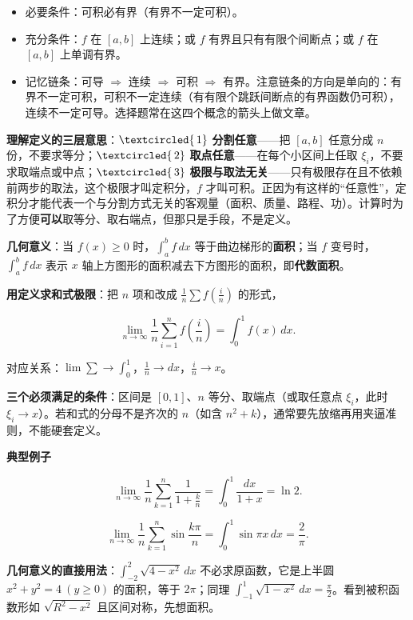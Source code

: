 \documentclass[11pt,openany,UTF8]{ctexbook}
\newcommand{\circled}[1]{\textcircled{\scriptsize\,#1}}
\begin{document}
\begin{itemize}
\item 必要条件：可积必有界（有界不一定可积）。
\item 充分条件：$f$ 在 $[a,b]$ 上连续；或 $f$ 有界且只有有限个间断点；或 $f$ 在 $[a,b]$ 上单调有界。
\item 记忆链条：可导 $\Rightarrow$ 连续 $\Rightarrow$ 可积 $\Rightarrow$ 有界。注意链条的方向是单向的：有界不一定可积，可积不一定连续（有有限个跳跃间断点的有界函数仍可积），连续不一定可导。选择题常在这四个概念的箭头上做文章。
\end{itemize}
\textbf{理解定义的三层意思}：$\circled{1}$ \textbf{分割任意}——把 $[a,b]$ 任意分成 $n$ 份，不要求等分；$\circled{2}$ \textbf{取点任意}——在每个小区间上任取 $\xi_i$，不要求取端点或中点；$\circled{3}$ \textbf{极限与取法无关}——只有极限存在且不依赖前两步的取法，这个极限才叫定积分，$f$ 才叫可积。正因为有这样的“任意性”，定积分才能代表一个与分割方式无关的客观量（面积、质量、路程、功）。计算时为了方便\textbf{可以}取等分、取右端点，但那只是手段，不是定义。

\textbf{几何意义}：当 $f(x)\geq0$ 时，$\int_a^bf\,dx$ 等于曲边梯形的\textbf{面积}；当 $f$ 变号时，$\int_a^bf\,dx$ 表示 $x$ 轴上方图形的面积减去下方图形的面积，即\textbf{代数面积}。

\textbf{用定义求和式极限}：把 $n$ 项和改成 $\frac{1}{n}\sum f\left(\frac{i}{n}\right)$ 的形式，

\[\lim_{n\to\infty}\frac{1}{n}\sum_{i=1}^{n}f\left(\frac{i}{n}\right)=\int_0^1f(x)\,dx.\]

对应关系：$\lim\sum\to\int_0^1$，$\frac{1}{n}\to dx$，$\frac{i}{n}\to x$。

\textbf{三个必须满足的条件}：区间是 $[0,1]$、$n$ 等分、取端点（或取任意点 $\xi_i$，此时 $\xi_i\to x$）。若和式的分母不是齐次的 $n$（如含 $n^2+k$），通常要先放缩再用夹逼准则，不能硬套定义。

\textbf{典型例子}

\[\lim_{n\to\infty}\frac{1}{n}\sum_{k=1}^{n}\frac{1}{1+\frac{k}{n}}=\int_0^1\frac{dx}{1+x}=\ln 2.\]

\[\lim_{n\to\infty}\frac{1}{n}\sum_{k=1}^{n}\sin\frac{k\pi}{n}=\int_0^1\sin\pi x\,dx=\frac{2}{\pi}.\]

\textbf{几何意义的直接用法}：$\int_{-2}^{2}\sqrt{4-x^2}\,dx$ 不必求原函数，它是上半圆 $x^2+y^2=4\ (y\geq0)$ 的面积，等于 $2\pi$；同理 $\int_{-1}^{1}\sqrt{1-x^2}\,dx=\frac{\pi}{2}$。看到被积函数形如 $\sqrt{R^2-x^2}$ 且区间对称，先想面积。
\end{document}
